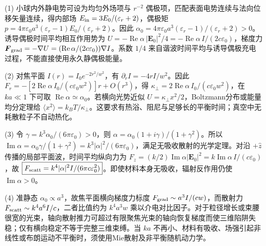 (1) 小球内外静电势可设为均匀外场项与 \(r^{-2}\) 偶极项，匹配表面电势连续与法向位移矢量连续，得内部场 \(E_{\rm in}=3E_0/(\varepsilon_r+2)\)，偶极矩 \(p=4\pi\varepsilon_0a^3(\varepsilon_r-1)E_0/(\varepsilon_r+2)\)。因此 \(\boxed{\alpha_0=4\pi\varepsilon_0a^3(\varepsilon_r-1)/(\varepsilon_r+2)}>0\)。诱导偶极时间平均相互作用势为 \(U=-\operatorname{Re}\alpha\,|\boldsymbol E_0|^2/4=-\operatorname{Re}\alpha\,I/(2c\varepsilon_0)\)，梯度力 \(\boldsymbol F_{\rm grad}=-\nabla U=(\operatorname{Re}\alpha/(2c\varepsilon_0))\nabla I\)。系数 \(1/4\) 来自谐波时间平均与诱导偶极充电过程，不能直接使用永久静偶极能量。

(2) 对焦平面 \(I(r)=I_0e^{-2r^2/w^2}\)，有 \(\partial_r I=-4rI/w^2\)。因此 \(F_r=-[2\operatorname{Re}\alpha\,I_0/(c\varepsilon_0w^2)]r+O(r^3)\)，得 \(\boxed{\kappa_\perp=2\operatorname{Re}\alpha\,I_0/(c\varepsilon_0w^2)}\)，在 \(ka\ll1\) 下可取 \(\operatorname{Re}\alpha\simeq\alpha_0\)。若横向光势近似 \(U=\kappa_\perp x^2/2\)，Boltzmann分布或能量均分定理给 \(\boxed{\langle x^2\rangle=k_BT/\kappa_\perp}\)。这要求有热浴、阻尼与足够长的平衡时间；真空中无耗散粒子不自动热化。

(3) 令 \(\gamma=k^3\alpha_0/(6\pi\varepsilon_0)>0\)，则 \(\alpha=\alpha_0(1+i\gamma)/(1+\gamma^2)\)。所以 \(\operatorname{Im}\alpha=\alpha_0\gamma/(1+\gamma^2)=k^3|\alpha|^2/(6\pi\varepsilon_0)\)，满足无吸收散射的光学定理。对沿 \(+\hat z\) 传播的局部平面波，时间平均纵向力为 \(F_z=(k/2)\operatorname{Im}\alpha|\boldsymbol E_0|^2=k\operatorname{Im}\alpha\,I/(c\varepsilon_0)\)，故 \(\boxed{F_{\rm scatt}=k^4|\alpha|^2 I/(6\pi c\varepsilon_0^2)}\)。即使材料本身无吸收，辐射反作用仍使 \(\operatorname{Im}\alpha>0\)。

(4) 准静态 \(\alpha_0\propto a^3\)，故焦平面横向梯度力标度 \(F_{\rm grad}\sim a^3I/(cw)\)，而散射力 \(F_{\rm scatt}\sim k^4a^6I/c\)，二者比值约为 \(k^4a^3w\) 乘以介电对比因子。对于粒径增长或束腰很宽的光束，轴向散射推力可超过有限聚焦光束的轴向恢复梯度而使三维陷阱失稳；仅有横向稳定不等于完整三维束缚。当 \(ka\) 不再小、材料有吸收、场强引起非线性或布朗运动不平衡时，须使用Mie散射及非平衡随机动力学。
